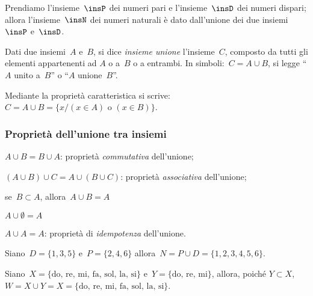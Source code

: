 Prendiamo l'insieme~\(\insP\) dei numeri pari e l'insieme~\(\insD\) dei 
numeri dispari; allora l'insieme~\(\insN\) dei numeri naturali è dato 
dall'unione dei due insiemi~\(\insP\) e~\(\insD\).

\begin{definizione}
Dati due insiemi~\(A\) e~\(B\), si dice
\emph{insieme unione} l'insieme~\(C\), composto da tutti gli elementi 
appartenenti ad \(A\) o a~\(B\) o a entrambi.
In simboli:~\(C=A\cup B\), si legge ``\(A\) unito a~\(B\)''
o ``\(A\) unione~\(B\)''.
\end{definizione}
\begin{center}
 
\end{center}


Mediante la proprietà caratteristica si 
scrive:~\(C=A\cup B=\{x/(x\in A)\text{ o }(x\in B)\}\).

\subsubsection{Proprietà dell'unione tra insiemi}

\begin{enumeratea}
\item \(A\cup B=B\cup A\): proprietà \emph{commutativa} dell'unione;
\item \((A\cup B)\cup C=A\cup (B\cup C)\): proprietà \emph{associativa} 
dell'unione;
\item se~\(B\subset A\), allora~\(A\cup B=A\)
\item \(A\cup \emptyset =A\)
\item \(A\cup A=A\): proprietà di \emph{idempotenza} dell'unione.
\end{enumeratea}

\begin{exrig}
 \begin{esempio}
Siano~\(D=\{1,3,5\}\) e~\(P=\{2,4,6\}\) 
allora~\(N=P\cup D=\{1,2,3,4,5,6\}\).
\begin{center}
 
\end{center}

\end{esempio}

\begin{esempio}
Siano~\(X=\{\text{do, re, mi, fa, sol, la, si}\}\)
e~\(Y=\{\text{do, re, mi}\}\), allora, 
poiché 
\(Y\subset X\), \(W=X\cup Y=X=\{\text{do, re, mi, fa, sol, la, si}\}\).
\begin{center}
 
\end{center}

\end{esempio}
\end{exrig}

